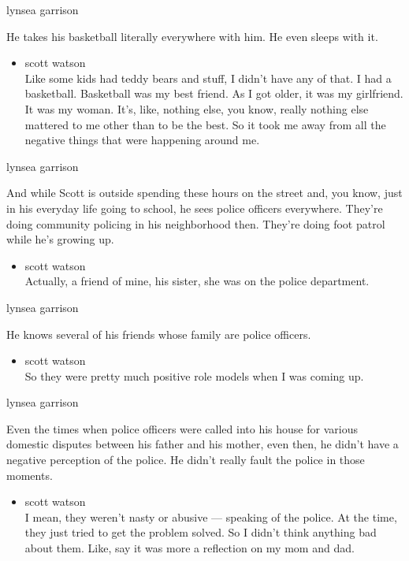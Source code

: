 lynsea garrison

He takes his basketball literally everywhere with him. He even sleeps
with it.

\begin{itemize}
\tightlist
\item
  scott watson\\
  Like some kids had teddy bears and stuff, I didn't have any of that. I
  had a basketball. Basketball was my best friend. As I got older, it
  was my girlfriend. It was my woman. It's, like, nothing else, you
  know, really nothing else mattered to me other than to be the best. So
  it took me away from all the negative things that were happening
  around me.
\end{itemize}

lynsea garrison

And while Scott is outside spending these hours on the street and, you
know, just in his everyday life going to school, he sees police officers
everywhere. They're doing community policing in his neighborhood then.
They're doing foot patrol while he's growing up.

\begin{itemize}
\tightlist
\item
  scott watson\\
  Actually, a friend of mine, his sister, she was on the police
  department.
\end{itemize}

lynsea garrison

He knows several of his friends whose family are police officers.

\begin{itemize}
\tightlist
\item
  scott watson\\
  So they were pretty much positive role models when I was coming up.
\end{itemize}

lynsea garrison

Even the times when police officers were called into his house for
various domestic disputes between his father and his mother, even then,
he didn't have a negative perception of the police. He didn't really
fault the police in those moments.

\begin{itemize}
\tightlist
\item
  scott watson\\
  I mean, they weren't nasty or abusive --- speaking of the police. At
  the time, they just tried to get the problem solved. So I didn't think
  anything bad about them. Like, say it was more a reflection on my mom
  and dad.
\end{itemize}

